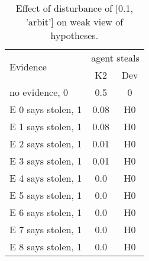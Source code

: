 \begin{table}\begin{tabular}{l|cc}\toprule\multirow{2}{*}{Evidence} & \multicolumn{2}{c}{agent steals}\\& {K2} & {Dev}\\\midrule
no evidence, 0 & \cellcolor{Bittersweet}0.5&\cellcolor{Bittersweet}0\\E 0 says stolen, 1 & \cellcolor{Bittersweet}0.08&\cellcolor{Bittersweet}H0\\E 1 says stolen, 1 & \cellcolor{Bittersweet}0.08&\cellcolor{Bittersweet}H0\\E 2 says stolen, 1 & \cellcolor{Bittersweet}0.01&\cellcolor{Bittersweet}H0\\E 3 says stolen, 1 & \cellcolor{Bittersweet}0.01&\cellcolor{Bittersweet}H0\\E 4 says stolen, 1 & \cellcolor{Bittersweet}0.0&\cellcolor{Bittersweet}H0\\E 5 says stolen, 1 & \cellcolor{Bittersweet}0.0&\cellcolor{Bittersweet}H0\\E 6 says stolen, 1 & \cellcolor{Bittersweet}0.0&\cellcolor{Bittersweet}H0\\E 7 says stolen, 1 & \cellcolor{Bittersweet}0.0&\cellcolor{Bittersweet}H0\\E 8 says stolen, 1 & \cellcolor{Bittersweet}0.0&\cellcolor{Bittersweet}H0\\\bottomrule\end{tabular}\caption{Effect of disturbance of [0.1, 'arbit'] on weak view of hypotheses.}\end{table}